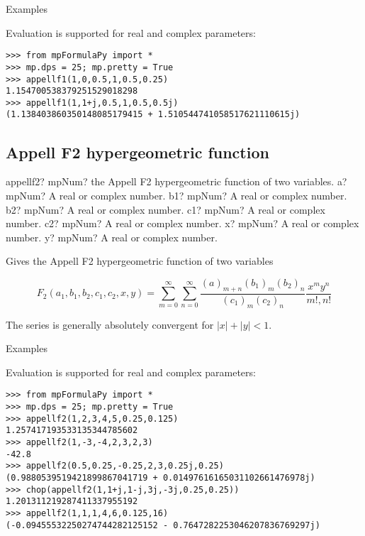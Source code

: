 Examples

Evaluation is supported for real and complex parameters:

\begin{lstlisting}
>>> from mpFormulaPy import *
>>> mp.dps = 25; mp.pretty = True
>>> appellf1(1,0,0.5,1,0.5,0.25)
1.154700538379251529018298
>>> appellf1(1,1+j,0.5,1,0.5,0.5j)
(1.138403860350148085179415 + 1.510544741058517621110615j)
\end{lstlisting}



\subsection{Appell F2 hypergeometric function}

\begin{mpFunctionsExtract}
	\mpFunctionSeven
	{appellf2? mpNum? the Appell F2 hypergeometric function of two variables.}
	{a? mpNum? A real or complex number.}
	{b1? mpNum? A real or complex number.}	
	{b2? mpNum? A real or complex number.}
	{c1? mpNum? A real or complex number.}
	{c2? mpNum? A real or complex number.}		
	{x? mpNum? A real or complex number.}		
	{y? mpNum? A real or complex number.}		
\end{mpFunctionsExtract}

\vpara
Gives the Appell F2 hypergeometric function of two variables

\begin{equation}
F_2(a_1,b_1,b_2,c_1,c_2,x,y) = \sum_{m=0}^{\infty} \sum_{n=0}^{\infty} \frac{(a)_{m+n}(b_1)_m (b_2)_n}{(c_1)_{m}(c_2)_{n}} \frac{x^my^n}{m!,n!}
\end{equation}


The series is generally absolutely convergent for $|x|+|y|<1$.

Examples

Evaluation is supported for real and complex parameters:

\begin{lstlisting}
>>> from mpFormulaPy import *
>>> mp.dps = 25; mp.pretty = True
>>> appellf2(1,2,3,4,5,0.25,0.125)
1.257417193533135344785602
>>> appellf2(1,-3,-4,2,3,2,3)
-42.8
>>> appellf2(0.5,0.25,-0.25,2,3,0.25j,0.25)
(0.9880539519421899867041719 + 0.01497616165031102661476978j)
>>> chop(appellf2(1,1+j,1-j,3j,-3j,0.25,0.25))
1.201311219287411337955192
>>> appellf2(1,1,1,4,6,0.125,16)
(-0.09455532250274744282125152 - 0.7647282253046207836769297j)
\end{lstlisting}





